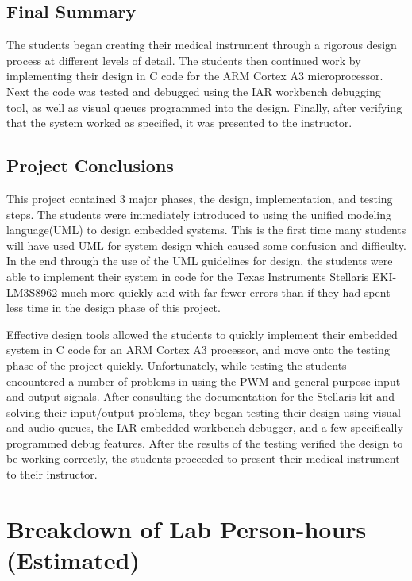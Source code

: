 \documentclass[12pt]{article} %
\begin{document}
\subsection{Final Summary} The students began creating their medical instrument
through a rigorous design process at different levels of detail. The students
then continued work by implementing their design in C code for the ARM Cortex
A3 microprocessor. Next the code was tested and debugged using the IAR
workbench debugging tool, as well as visual queues programmed into the design.
Finally, after verifying that the system worked as specified, it was presented
to the instructor.

\subsection{Project Conclusions} This project contained 3 major phases, the
design, implementation, and testing steps. The students were immediately
introduced to using the unified modeling language(UML) to design embedded
systems. This is the first time many students will have used UML for system
design which caused some confusion and difficulty. In the end through the use
of the UML guidelines for design, the students were able to implement their
system in code for the Texas Instruments Stellaris EKI-LM3S8962 much more
quickly and with far fewer errors than if they had spent less time in the
design phase of this project. 

Effective design tools allowed the students to quickly implement their embedded system in C code for an ARM Cortex A3 processor, and move onto the testing phase of the project quickly. Unfortunately, while testing the students encountered a number of problems in using the PWM and general purpose input and output signals. After consulting the documentation for the Stellaris kit and solving their input/output problems, they began testing their design using visual and audio queues, the IAR embedded workbench debugger, and a few specifically programmed debug features. After the results of the testing verified the design to be working correctly, the students proceeded to present their medical instrument to their instructor.

\pagebreak
\appendix

\section{Breakdown of Lab Person-hours (Estimated)}
\end{document}
